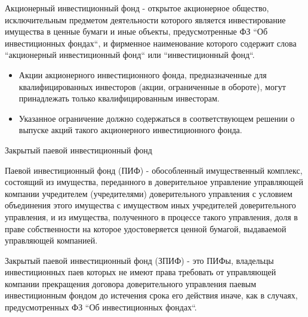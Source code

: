\documentclass[_Venture_p1.tex]{subfiles}
\begin{document}
\begin{frame}
\begin{block}{Акционерный инвестиционный фонд }
	\quad
	- открытое акционерное общество, исключительным предметом деятельности которого является инвестирование имущества в ценные бумаги и иные объекты, предусмотренные ФЗ ``Об инвестиционных фондах``, и фирменное наименование которого содержит слова ``акционерный инвестиционный фонд`` или ``инвестиционный фонд``.
\end{block}
\end{frame}

\begin{frame}
\begin{itemize}
	\item Акции акционерного инвестиционного фонда, предназначенные для квалифицированных инвесторов (акции, ограниченные в обороте), могут принадлежать только квалифицированным инвесторам. 
	\item Указанное ограничение должно содержаться в соответствующем решении о выпуске акций такого акционерного инвестиционного фонда.
\end{itemize}
\end{frame}

\begin{frame}[allowframebreaks]{Закрытый паевой инвестиционный фонд }
\begin{block}{Паевой инвестиционный фонд (ПИФ) }
	\quad
	- обособленный имущественный комплекс, состоящий из имущества, переданного в доверительное управление управляющей компании учредителем (учредителями) доверительного управления с условием объединения этого имущества с имуществом иных учредителей доверительного управления, и из имущества, полученного в процессе такого управления, доля в праве собственности на которое удостоверяется ценной бумагой, выдаваемой управляющей компанией.
\end{block}

\pagebreak
\begin{block}{Закрытый паевой инвестиционный фонд (ЗПИФ)}
	\quad
	- это ПИФы, владельцы инвестиционных паев которых не имеют права требовать от управляющей компании прекращения договора доверительного управления паевым инвестиционным фондом до истечения срока его действия иначе, как в случаях, предусмотренных ФЗ ``Об инвестиционных фондах``.
\end{block}
\end{frame}
\end{document}
